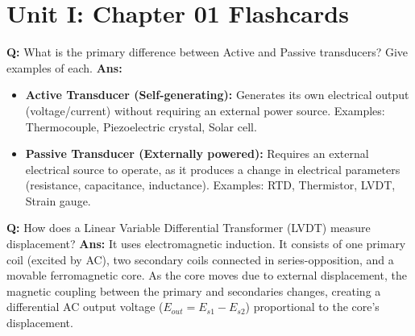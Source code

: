 \documentclass[10pt,a4paper,twocolumn]{article}
\begin{document}

\section*{Unit I: Chapter 01 Flashcards}

\begin{tcolorbox}[
  colback=white,
  colframe=UnitColorOne,
  colbacktitle=gray!10!white,
  coltitle=black,
  fonttitle=\bfseries\sffamily\small,
  title={Unit I $\bullet$ Card 1: Active vs. Passive Transducers},
  boxrule=1.2pt,
  arc=2mm,
  outer arc=2mm,
  boxsep=1.5mm,
  top=1mm,
  bottom=1mm,
  left=1.5mm,
  right=1.5mm,
  before skip=2.5mm,
  after skip=2.5mm
]
\textbf{Q:} What is the primary difference between Active and Passive transducers? Give examples of each.
\tcbline
\textbf{Ans:} \begin{itemize}
  \item   \textbf{Active Transducer (Self-generating):} Generates its own electrical output (voltage/current) without requiring an external power source. Examples: Thermocouple, Piezoelectric crystal, Solar cell.
  \item   \textbf{Passive Transducer (Externally powered):} Requires an external electrical source to operate, as it produces a change in electrical parameters (resistance, capacitance, inductance). Examples: RTD, Thermistor, LVDT, Strain gauge.
\end{itemize}
\end{tcolorbox}


\begin{tcolorbox}[
  colback=white,
  colframe=UnitColorOne,
  colbacktitle=gray!10!white,
  coltitle=black,
  fonttitle=\bfseries\sffamily\small,
  title={Unit I $\bullet$ Card 2: LVDT Operating Principle},
  boxrule=1.2pt,
  arc=2mm,
  outer arc=2mm,
  boxsep=1.5mm,
  top=1mm,
  bottom=1mm,
  left=1.5mm,
  right=1.5mm,
  before skip=2.5mm,
  after skip=2.5mm
]
\textbf{Q:} How does a Linear Variable Differential Transformer (LVDT) measure displacement?
\tcbline
\textbf{Ans:} It uses electromagnetic induction. It consists of one primary coil (excited by AC), two secondary coils connected in series-opposition, and a movable ferromagnetic core. As the core moves due to external displacement, the magnetic coupling between the primary and secondaries changes, creating a differential AC output voltage ($E_{out} = E_{s1} - E_{s2}$) proportional to the core's displacement.
\end{tcolorbox}
\end{document}
